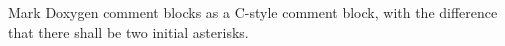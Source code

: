 \subsection*{\doxygenRule{}}

Mark Doxygen comment blocks as a C-style comment block, with the difference that there shall be two initial asterisks.

\noindent
\begin{minipage}[t]{0.47\textwidth}
    
\end{minipage}\hfill
\begin{minipage}[t]{0.47\textwidth}
    
\end{minipage}

